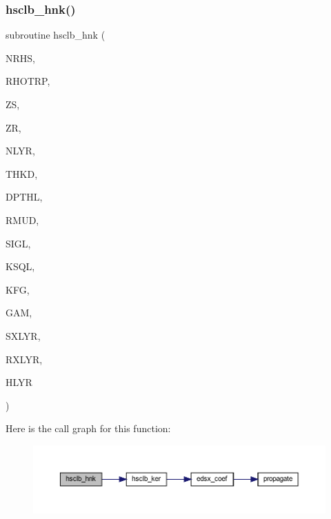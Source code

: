 \subsubsection{\texorpdfstring{hsclb\+\_\+hnk()}{hsclb\_hnk()}}
{\footnotesize\ttfamily subroutine hsclb\+\_\+hnk (\begin{DoxyParamCaption}\item[{integer}]{N\+R\+HS,  }\item[{real, dimension(nrhs)}]{R\+H\+O\+T\+RP,  }\item[{real(kind=ql)}]{ZS,  }\item[{real(kind=ql)}]{ZR,  }\item[{integer}]{N\+L\+YR,  }\item[{real(kind=ql), dimension (nlyr)}]{T\+H\+KD,  }\item[{real(kind=ql), dimension (nlyr)}]{D\+P\+T\+HL,  }\item[{real(kind=ql), dimension(0\+:nlyr)}]{R\+M\+UD,  }\item[{complex(kind=ql), dimension (nlyr)}]{S\+I\+GL,  }\item[{complex(kind=ql), dimension (nlyr)}]{K\+S\+QL,  }\item[{integer}]{K\+FG,  }\item[{integer}]{G\+AM,  }\item[{integer}]{S\+X\+L\+YR,  }\item[{integer}]{R\+X\+L\+YR,  }\item[{complex, dimension(nrhs,3)}]{H\+L\+YR }\end{DoxyParamCaption})}

Here is the call graph for this function\+:\nopagebreak
\begin{figure}[H]
\begin{center}
\leavevmode
\includegraphics[width=350pt]{Leroi__c_8f90_ae6841c5477812a4e7255f7ed2da9a7c8_cgraph}
\end{center}
\end{figure}
\mbox{\label{Leroi__c_8f90_ab053f1c7997499ed6fca932a2f8cbecb}} 
